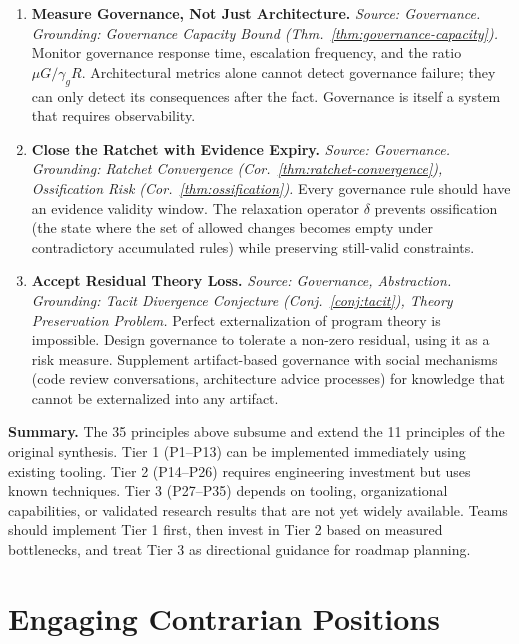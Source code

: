 \documentclass[11pt, a4paper]{googledeepmind}
\begin{document}
\begin{enumerate}[label=\textbf{P\arabic*.}, leftmargin=3em, resume]
\item \textbf{Measure Governance, Not Just Architecture.}
\emph{Source: Governance. Grounding: Governance Capacity Bound (Thm.~\ref{thm:governance-capacity}).}
Monitor governance response time, escalation frequency, and the ratio $\mu G / \gamma_g R$. Architectural metrics alone cannot detect governance failure; they can only detect its consequences after the fact. Governance is itself a system that requires observability.

\item \textbf{Close the Ratchet with Evidence Expiry.}
\emph{Source: Governance. Grounding: Ratchet Convergence (Cor.~\ref{thm:ratchet-convergence}), Ossification Risk (Cor.~\ref{thm:ossification}).}
Every governance rule should have an evidence validity window. The relaxation operator $\delta$ prevents ossification (the state where the set of allowed changes becomes empty under contradictory accumulated rules) while preserving still-valid constraints.

\item \textbf{Accept Residual Theory Loss.}
\emph{Source: Governance, Abstraction. Grounding: Tacit Divergence Conjecture (Conj.~\ref{conj:tacit}), Theory Preservation Problem.}
Perfect externalization of program theory is impossible. Design governance to tolerate a non-zero residual, using it as a risk measure. Supplement artifact-based governance with social mechanisms (code review conversations, architecture advice processes) for knowledge that cannot be externalized into any artifact.

\end{enumerate}

\medskip
\noindent\textbf{Summary.} The 35 principles above subsume and extend the 11 principles of the original synthesis. Tier 1 (P1--P13) can be implemented immediately using existing tooling. Tier 2 (P14--P26) requires engineering investment but uses known techniques. Tier 3 (P27--P35) depends on tooling, organizational capabilities, or validated research results that are not yet widely available. Teams should implement Tier 1 first, then invest in Tier 2 based on measured bottlenecks, and treat Tier 3 as directional guidance for roadmap planning.
\section{Engaging Contrarian Positions}
\label{sec:contrarian}
\end{document}
